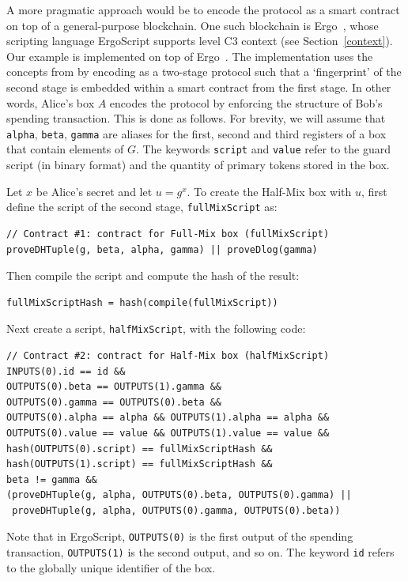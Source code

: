 \documentclass[runningheads]{llncs}
\newcommand{\langname}{ErgoScript\xspace}
\begin{document}
A more pragmatic approach would be to encode the protocol as a smart contract on top of a general-purpose blockchain. 
One such blockchain is Ergo~\cite{ergo}, whose scripting language \langname supports level C3 context (see Section~\ref{context}). Our example is implemented on top of Ergo~\cite{ergomix-impl}. 
The implementation uses the concepts from \cite{multistage} by encoding \algname as a two-stage protocol such that a `fingerprint' of the second stage is embedded within a smart contract from the first stage. 
In other words, Alice's box $A$ encodes the protocol by enforcing the structure of Bob's spending transaction. 
This is done as follows. For brevity, we will assume that \texttt{alpha}, \texttt{beta}, \texttt{gamma} are aliases for the first, second and third registers of a box that contain elements of $G$. The keywords \texttt{script} and \texttt{value} refer to the guard script (in binary format) and the quantity of primary tokens stored in the box. 

Let $x$ be Alice's secret and let $u = g^x$. To create the Half-Mix box with $u$, first define the script of the second stage, \texttt{fullMixScript} as:
{\small
\begin{Verbatim}[frame=single]
// Contract #1: contract for Full-Mix box (fullMixScript)
proveDHTuple(g, beta, alpha, gamma) || proveDlog(gamma)
\end{Verbatim}
}
Then compile the script and compute the hash of the result:

{\small
\begin{verbatim}
fullMixScriptHash = hash(compile(fullMixScript))
\end{verbatim}
}
Next create a script, \texttt{halfMixScript}, with the following code:
{\small
\begin{Verbatim}[frame=single]
// Contract #2: contract for Half-Mix box (halfMixScript)
INPUTS(0).id == id &&
OUTPUTS(0).beta == OUTPUTS(1).gamma && 
OUTPUTS(0).gamma == OUTPUTS(0).beta && 
OUTPUTS(0).alpha == alpha && OUTPUTS(1).alpha == alpha &&
OUTPUTS(0).value == value && OUTPUTS(1).value == value &&
hash(OUTPUTS(0).script) == fullMixScriptHash &&  
hash(OUTPUTS(1).script) == fullMixScriptHash &&
beta != gamma &&
(proveDHTuple(g, alpha, OUTPUTS(0).beta, OUTPUTS(0).gamma) || 
 proveDHTuple(g, alpha, OUTPUTS(0).gamma, OUTPUTS(0).beta))
\end{Verbatim}
}

Note that in \langname, \texttt{OUTPUTS(0)} is the first output of the spending transaction, \texttt{OUTPUTS(1)} is the second output, and so on. The keyword \texttt{id} refers to the globally unique identifier of the box. 
\end{document}
